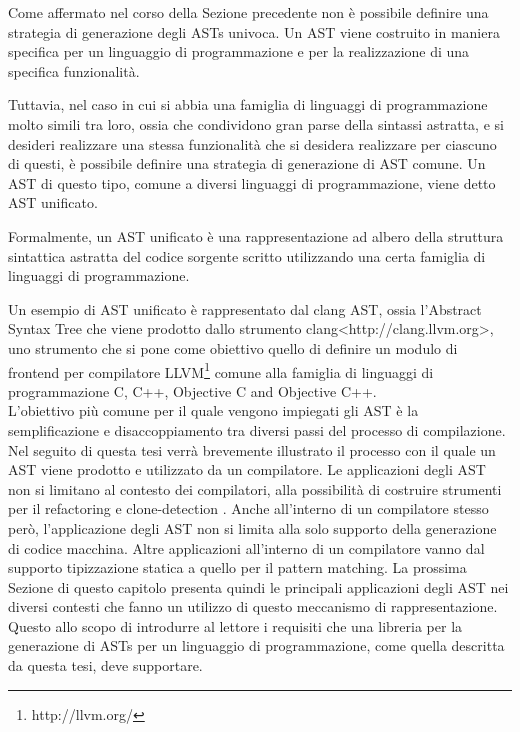 Come affermato nel corso della Sezione precedente non è possibile definire una
strategia di generazione degli ASTs univoca. Un AST viene costruito in maniera
specifica per un linguaggio di programmazione e per la realizzazione di una
specifica funzionalità.

Tuttavia, nel caso in cui si abbia una famiglia di linguaggi di programmazione
molto simili tra loro, ossia che condividono gran parse della sintassi
astratta, e si desideri realizzare una stessa funzionalità che si desidera
realizzare per ciascuno di questi, è possibile definire una strategia di
generazione di AST comune. Un AST di questo tipo, comune a diversi linguaggi di
programmazione, viene detto AST unificato.

Formalmente, un AST unificato è una rappresentazione ad albero della struttura
sintattica astratta del codice sorgente scritto utilizzando una certa famiglia
di linguaggi di programmazione.

Un esempio di AST unificato è rappresentato dal clang AST, ossia l’Abstract
Syntax Tree che viene prodotto dallo strumento clang<http://clang.llvm.org>,
uno strumento che si pone come obiettivo quello di definire un modulo di
frontend per compilatore LLVM\footnote{http://llvm.org/} comune alla famiglia
di linguaggi di programmazione C, C++, Objective C and Objective C++.\\

L’obiettivo più comune per il quale vengono impiegati gli AST è la
semplificazione e disaccoppiamento tra diversi passi del processo di
compilazione. Nel seguito di questa tesi verrà brevemente illustrato il
processo con il quale un AST viene prodotto e utilizzato da un compilatore. Le
applicazioni degli AST non si limitano al contesto dei compilatori, alla
possibilità di costruire strumenti per il refactoring \cite{jscodeshift2016} e
clone-detection \cite{DBLP:conf/saci/LazarB14}. Anche all’interno di un
compilatore stesso però, l’applicazione degli AST non si limita alla solo
supporto della generazione di codice macchina. Altre applicazioni all’interno
di un compilatore vanno dal supporto tipizzazione statica a quello per il
pattern matching. La prossima Sezione di questo capitolo presenta quindi le
principali applicazioni degli AST nei diversi contesti che fanno un utilizzo di
questo meccanismo di rappresentazione. Questo allo scopo di introdurre al
lettore i requisiti che una libreria per la generazione di ASTs per un
linguaggio di programmazione, come quella descritta da questa tesi, deve
supportare.\\

